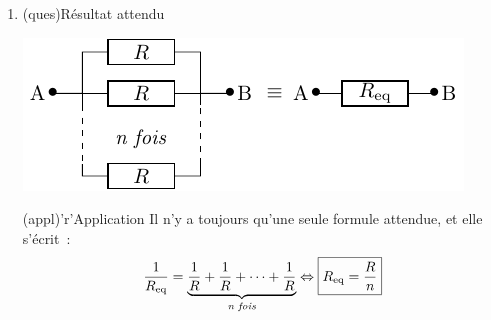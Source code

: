 \documentclass[../../main/main.tex]{subfiles}
\begin{document}
{\begin{enumerate}
\begin{center}
\begin{tcb}[width=\linewidth]
			      \end{tcb}
		      \end{center}
		\item
		      \begin{tcbraster}[raster columns=2, raster equal height=rows]
			      \begin{tcb}(ques){Résultat attendu}
				      \begin{center}
					      \includegraphics{nparrequiv}
				      \end{center}
			      \end{tcb}
			      \begin{tcb}(appl)'r'{Application}
				      Il n'y a toujours qu'une seule formule attendue, et elle s'écrit~:
				      \[ \frac{1}{R_{\rm eq}} = \underbrace{ \frac{1}{R} + \frac{1}{R} +
						      \cdots + \frac{1}{R}}_{\textit{n fois}} \Leftrightarrow
					      \boxed{R_{\rm eq} = \frac{R}{n}} \]
			      \end{tcb}
		      \end{tcbraster}
	\end{enumerate}
}
\end{document}
